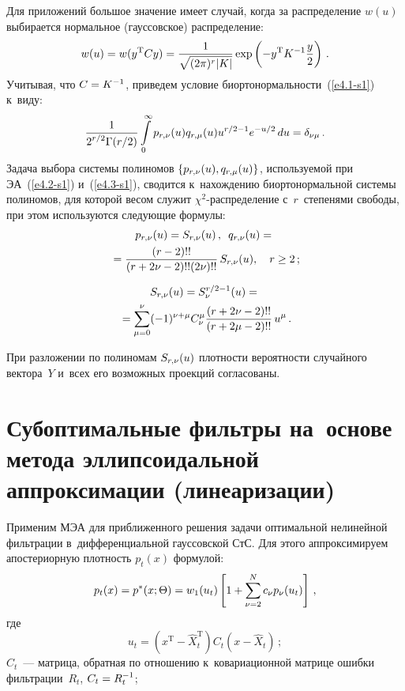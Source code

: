 \begin{multicols}{2}
Для приложений большое значение имеет случай, когда за
распределение $w(u)$ выбирается нормальное (гауссовское) распределение:
\begin{equation*}
w(u)=w(y^{\mathrm{T}}Cy)=\displaystyle\frac{\displaystyle 1\mathstrut}{\displaystyle \sqrt{(2\pi)^r\vert
    K\vert}\mathstrut}\exp\left(-y^{\mathrm{T}}K^{-1}\displaystyle\frac{\displaystyle y\mathstrut}{\displaystyle 2\mathstrut}\right)\,.
    \end{equation*}
Учитывая, что $C\hm=K^{-1}$, приведем условие биортонормальности~(\ref{e4.1-s1}) 
к~виду:
\begin{equation*}
\displaystyle\frac{\displaystyle 1\mathstrut}{\displaystyle 2^{r/2}\Gamma(r/2)\mathstrut}\int\limits_0^{\infty}
    p_{r,\nu}(u)q_{r,\mu}(u)u^{r/2-1}e^{-u/2}\,du=\delta_{\nu\mu}\,.
    \end{equation*}
Задача выбора системы полиномов $\{p_{r,\nu}(u),q_{r,\mu}(u)\}$,
используемой при ЭА~(\ref{e4.2-s1})
и~(\ref{e4.3-s1}), сводится к~нахождению биортонормальной системы
полиномов, для которой весом служит $\chi^2$-рас\-пре\-де\-ле\-ние 
с~$r$~степенями свободы, при этом используются
следующие формулы:
\begin{multline*}
p_{r,\nu}(u)=S_{r,\nu}(u)\,,\enskip q_{r,\nu}(u)={}\\
{}=
\displaystyle\frac{\displaystyle (r-2)!!\mathstrut}{\displaystyle (r+2\nu-2)!!(2\nu)!!\mathstrut}\,S_{r,\nu}(u),
    \quad r\ge 2\,;
    \end{multline*}
    
    \vspace*{-12pt}
    
    \noindent
\begin{multline*}
    S_{r,\nu}(u)=S_{\nu}^{r/2-1}(u)={}\\
    {}=\sum\limits_{\mu=0}^{\nu}(-1)^{\nu+\mu}
    C_{\nu}^{\mu}\displaystyle\frac{\displaystyle (r+2\nu-2)!!\mathstrut}{\displaystyle (r+2\mu-2)!!\mathstrut}\,u^{\mu}\,.
\end{multline*}

При разложении по полиномам $S_{r,\nu}(u)$ плот\-ности вероятности
случайного вектора~$Y$ и~всех его возможных проекций согласованы.

\vspace*{-3pt}

\section{Субоптимальные фильтры на~основе метода эллипсоидальной
аппроксимации (линеаризации)}

Применим МЭА для приближенного решения задачи оптимальной нелинейной 
фильтрации в~дифференциальной гауссовской СтС. Для этого аппроксимируем
апостериорную плотность $p_t(x)$ формулой:
\begin{equation}
p_t(x) = p^* (x;\Theta) = w_1 (u_t) \left[ 1+\sum\limits_{\nu=2}^N 
c_\nu p_\nu (u_t)\right]\,,
    \label{e5.1-s1}
    \end{equation}
    где
    $$
    u_t=\left(x^{\mathrm{T}} - \hat X_t^{\mathrm{T}}\right) 
    C_t\left(x-\hat X_t\right)\,;
$$
$C_t$~--- матрица, обратная по отношению к~ковариационной
матрице ошибки фильтрации~$R_t$, $C_t\hm=R_t^{-1}$;


\end{multicols}
